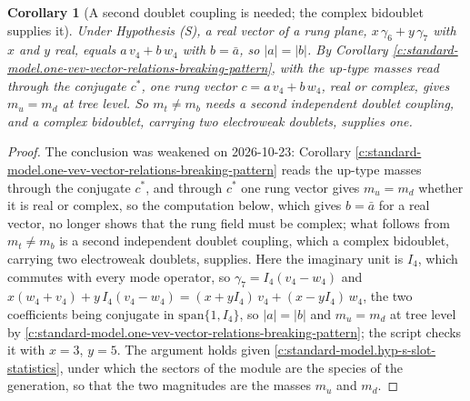 \documentclass[11pt]{article}
\newtheorem{corollary}[theorem]{Corollary}
\theoremstyle{definition}
\theoremstyle{plain}
\newcommand{\changedmark}[2]{\marginpar{\raggedright\scriptsize\color{#1}#2}}
\begin{document}
\begin{corollary}[A second doublet coupling is needed; the complex bidoublet supplies it]\label{c:standard-model.bidoublet-complex}
\changedmark{BurntOrange}{changed since the deposit}
Under Hypothesis (S), a real vector of a rung plane, $x\,\gamma_{6} + y\,\gamma_{7}$ with $x$ and $y$ real, equals $a\,v_{4} + b\,w_{4}$ with $b = \bar{a}$, so $|a| = |b|$. By Corollary \ref{c:standard-model.one-vev-vector-relations-breaking-pattern}, with the up-type masses read through the conjugate $c^{*}$, one rung vector $c = a\,v_{4} + b\,w_{4}$, real or complex, gives $m_{u} = m_{d}$ at tree level. So $m_{t} \ne m_{b}$ needs a second independent doublet coupling, and a complex bidoublet, carrying two electroweak doublets, supplies one.
\end{corollary}
\begin{proof}
The conclusion was weakened on 2026-10-23: Corollary \ref{c:standard-model.one-vev-vector-relations-breaking-pattern} reads the up-type masses through the conjugate $c^{*}$, and through $c^{*}$ one rung vector gives $m_{u} = m_{d}$ whether it is real or complex, so the computation below, which gives $b = \bar{a}$ for a real vector, no longer shows that the rung field must be complex; what follows from $m_{t} \neq m_{b}$ is a second independent doublet coupling, which a complex bidoublet, carrying two electroweak doublets, supplies. Here the imaginary unit is $I_{4}$, which commutes with every mode operator, so $\gamma_{7} = I_{4}(v_{4} - w_{4})$ and $x(w_{4} + v_{4}) + y\,I_{4}(v_{4} - w_{4}) = (x + yI_{4})\,v_{4} + (x - yI_{4})\,w_{4}$, the two coefficients being conjugate in $\mathrm{span}\{1, I_{4}\}$, so $|a| = |b|$ and $m_{u} = m_{d}$ at tree level by \ref{c:standard-model.one-vev-vector-relations-breaking-pattern}; the script checks it with $x = 3$, $y = 5$. The argument holds given \ref{c:standard-model.hyp-s-slot-statistics}, under which the sectors of the module are the species of the generation, so that the two magnitudes are the masses $m_{u}$ and $m_{d}$.

\end{proof}
\end{document}
